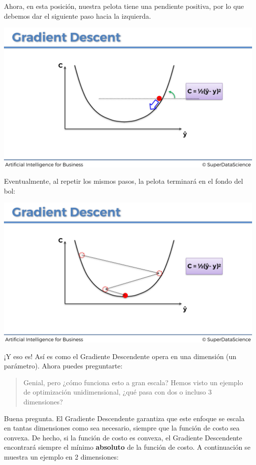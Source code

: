 \documentclass[
]{book}
\begin{document}
Ahora, en esta posición, nuestra pelota tiene una pendiente positiva, por lo que debemos dar el siguiente paso hacia la izquierda.

\includegraphics{Images/ANN_22.png}

Eventualmente, al repetir los mismos pasos, la pelota terminará en el fondo del bol:

\includegraphics{Images/ANN_23.png}

¡Y eso es! Así es como el Gradiente Descendente opera en una dimensión (un parámetro). Ahora puedes preguntarte:

\begin{quote}
Genial, pero ¿cómo funciona esto a gran escala? Hemos visto un ejemplo de optimización unidimensional, ¿qué pasa con dos o incluso 3 dimensiones?
\end{quote}

Buena pregunta. El Gradiente Descendente garantiza que este enfoque se escala en tantas dimensiones como sea necesario, siempre que la función de costo sea convexa. De hecho, si la función de costo es convexa, el Gradiente Descendente encontrará siempre el mínimo \textbf{absoluto} de la función de costo. A continuación se muestra un ejemplo en 2 dimensiones:
\end{document}
